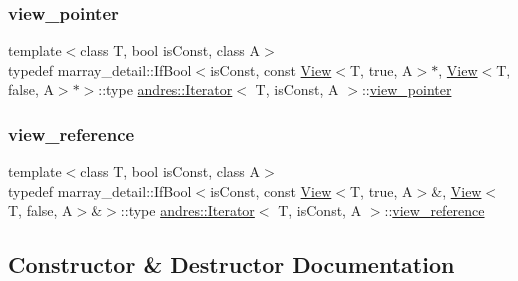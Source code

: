 \mbox{\label{classandres_1_1Iterator_a937adfd36b5e7b01be53d16bd823af12}} 
\subsubsection{\texorpdfstring{view\+\_\+pointer}{view\_pointer}}
{\footnotesize\ttfamily template$<$class T, bool is\+Const, class A$>$ \\
typedef marray\+\_\+detail\+::\+If\+Bool$<$is\+Const, const \hyperlink{classandres_1_1View}{View}$<$T, true, A$>$$\ast$, \hyperlink{classandres_1_1View}{View}$<$T, false, A$>$$\ast$$>$\+::type \hyperlink{classandres_1_1Iterator}{andres\+::\+Iterator}$<$ T, is\+Const, A $>$\+::\hyperlink{classandres_1_1Iterator_a937adfd36b5e7b01be53d16bd823af12}{view\+\_\+pointer}}

\mbox{\label{classandres_1_1Iterator_aba3b6dd25a055f0aaa7a931657f86a89}} 
\subsubsection{\texorpdfstring{view\+\_\+reference}{view\_reference}}
{\footnotesize\ttfamily template$<$class T, bool is\+Const, class A$>$ \\
typedef marray\+\_\+detail\+::\+If\+Bool$<$is\+Const, const \hyperlink{classandres_1_1View}{View}$<$T, true, A$>$\&, \hyperlink{classandres_1_1View}{View}$<$T, false, A$>$\&$>$\+::type \hyperlink{classandres_1_1Iterator}{andres\+::\+Iterator}$<$ T, is\+Const, A $>$\+::\hyperlink{classandres_1_1Iterator_aba3b6dd25a055f0aaa7a931657f86a89}{view\+\_\+reference}}



\subsection{Constructor \& Destructor Documentation}
\mbox{\label{classandres_1_1Iterator_a6a97994e2999c992ed829b3da6c748bf}} 
